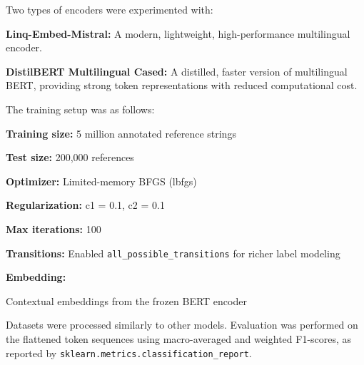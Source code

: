 Two types of encoders were experimented with:
\begin{compactitem}
\item \textbf{Linq-Embed-Mistral:} A modern, lightweight, high-performance multilingual encoder.
\item \textbf{DistilBERT Multilingual Cased:} A distilled, faster version of multilingual BERT, providing strong token representations with reduced computational cost.
\end{compactitem}

The training setup was as follows:
\begin{compactitem}
\item \textbf{Training size:} 5 million annotated reference strings
\item \textbf{Test size:} 200,000 references
\item \textbf{Optimizer:} Limited-memory BFGS (lbfgs)
\item \textbf{Regularization:} c1 = 0.1, c2 = 0.1
\item \textbf{Max iterations:} 100
\item \textbf{Transitions:} Enabled \texttt{all\_possible\_transitions} for richer label modeling
\item \textbf{Embedding:}
\begin{compactitem}
    \item Contextual embeddings from the frozen BERT encoder
\end{compactitem}
\end{compactitem}

Datasets were processed similarly to other models. Evaluation was performed on the flattened token sequences using macro-averaged and weighted F1-scores, as reported by \texttt{sklearn.metrics.classification\_report}.
